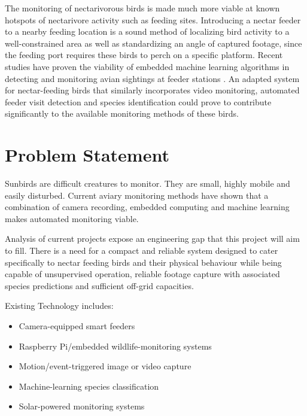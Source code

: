 \par\vspace{6pt}
The monitoring of nectarivorous birds is made much more viable at known hotspots of nectarivore activity such as feeding sites. Introducing a nectar feeder to a nearby feeding location is a sound method of localizing bird activity to a well-constrained area as well as standardizing an angle of captured footage, since the feeding port requires these birds to perch on a specific platform. Recent studies have proven the viability of embedded machine learning algorithms in detecting and monitoring avian sightings at feeder stations \cite{Youngblood2019}. An adapted system for nectar-feeding birds that similarly incorporates video monitoring, automated feeder visit detection and species identification could prove to contribute significantly to the available monitoring methods of these birds.

\section{Problem Statement}

Sunbirds are difficult creatures to monitor. They are small, highly mobile and easily disturbed. Current aviary monitoring methods have shown that a combination of camera recording, embedded computing and machine learning makes automated monitoring viable. 
\par\vspace{6pt}
Analysis of current projects expose an engineering gap that this project will aim to fill. There is a need for a compact and reliable system designed to cater specifically to nectar feeding birds and their physical behaviour while being capable of unsupervised operation, reliable footage capture with associated species predictions and sufficient off-grid capacities.

\par\vspace{6pt}
Existing Technology includes:
\begin{itemize}
    \item Camera-equipped smart feeders
    \item Raspberry Pi/embedded wildlife-monitoring systems
    \item Motion/event-triggered image or video capture
    \item Machine-learning species classification
    \item Solar-powered monitoring systems
\end{itemize}

